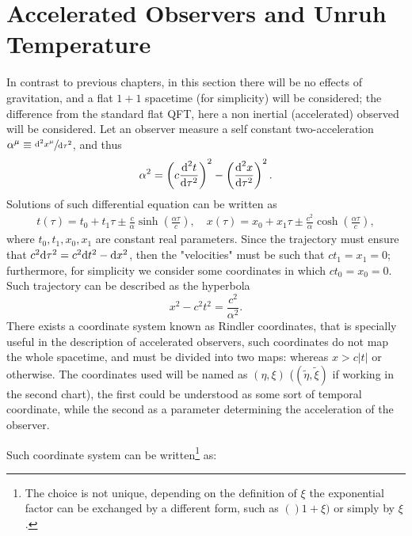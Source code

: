 \section{Accelerated Observers and Unruh Temperature}
In contrast to previous chapters, in this section there will be no effects of gravitation, and a flat $1+1$ spacetime (for simplicity) will be considered; the difference from the standard flat QFT, here a non inertial (accelerated) observed will be considered. Let an observer measure a self constant two-acceleration $\alpha^\mu\equiv \sfrac{\text{d}^2 x^\mu}{\text{d}\tau^2}$, and thus
\begin{equation}
	\alpha^2=\left(c\frac{\text{d}^2 t}{\text{d}\tau^2}\right)^2-\left(\frac{\text{d}^2x}{\text{d}\tau^2}\right)^2.
\end{equation}
Solutions of such differential equation can be written as
\begin{subequations}
	\begin{gather}
		t(\tau)=t_0+t_1\tau\pm\frac{c}{\alpha}\sinh\left(\frac{\alpha\tau}{c}\right),\quad x(\tau)=x_0+x_1\tau\pm\frac{c^2}{\alpha}\cosh\left(\frac{\alpha\tau}{c}\right),\tag{\theequation \,\,a,b}
	\end{gather}
\end{subequations}
where $t_0,t_1,x_0,x_1$ are constant real parameters. Since the trajectory must ensure that $c^2\text{d}\tau^2=c^2\text{d} t^2-\text{d} x^2$, then the "velocities" must be such that $ct_1=x_1=0$; furthermore, for simplicity we consider some coordinates in which $ct_0=x_0=0$. Such trajectory can be described as the hyperbola
\begin{equation}
	x^2-c^2t^2=\frac{c^2}{\alpha^2}.
\end{equation}
There exists a coordinate system known as Rindler coordinates, that is specially useful in the description of accelerated observers, such coordinates do not map the whole spacetime, and must be divided into two maps: whereas $x>c|t|$ or otherwise. The coordinates used will be named as $(\eta,\xi)$ ($(\tilde\eta,\tilde\xi)$ if working in the second chart), the first could be understood as some sort of temporal coordinate, while the second as a parameter determining the acceleration of the observer.
\begin{wrapfigure}[13]{r}{0.49\textwidth}
\end{wrapfigure}
Such coordinate system can be written\footnote{The choice is not unique, depending on the definition of $\xi$ the exponential factor can be exchanged by a different form, such as $()1+\xi)$ or simply by $\xi$.} as:
